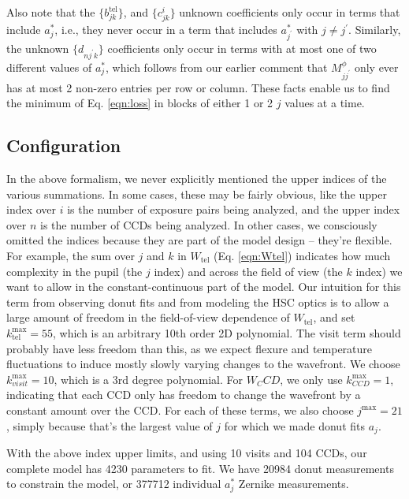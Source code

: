 \documentclass{article}
\begin{document}
Also note that the $\{b^\mathrm{tel}_{jk}\}$, and $\{c^i_{jk}\}$ unknown
coefficients only occur in terms that include $a_j^\ast$, i.e., they never occur
in a term that includes $a_{j^\prime}^\ast$ with $j \ne j^\prime$.  Similarly,
the unknown $\{d_{n j^\prime k}\}$ coefficients only occur in terms with at most
one of two different values of $a_j^\ast$, which follows from our earlier
comment that $M^\phi_{j j^\prime}$ only ever has at most 2 non-zero entries per
row or column.  These facts enable us to find the minimum of Eq. \ref{eqn:loss}
in blocks of either 1 or 2 $j$ values at a time.

\subsection{Configuration}

In the above formalism, we never explicitly mentioned the upper indices of the
various summations.  In some cases, these may be fairly obvious, like the upper
index over $i$ is the number of exposure pairs being analyzed, and the upper
index over $n$ is the number of CCDs being analyzed.  In other cases, we
consciously omitted the indices because they are part of the model design --
they're flexible.  For example, the sum over $j$ and $k$ in $W_\mathrm{tel}$
(Eq. \ref{eqn:Wtel}) indicates how much complexity in the pupil (the $j$ index)
and across the field of view (the $k$ index) we want to allow in the
constant-continuous part of the model.  Our intuition for this term from
observing donut fits and from modeling the HSC optics is to allow a large amount
of freedom in the field-of-view dependence of $W_\mathrm{tel}$, and set
$k^\mathrm{max}_\mathrm{tel} = 55$, which is an arbitrary 10th order 2D
polynomial.  The visit term should probably have less freedom than this, as we
expect flexure and temperature fluctuations to induce mostly slowly varying
changes to the wavefront.  We choose $k^\mathrm{max}_{visit} = 10$, which is a
3rd degree polynomial.  For $W_CCD$, we only use $k^\mathrm{max}_{CCD} = 1$,
indicating that each CCD only has freedom to change the wavefront by a constant
amount over the CCD.  For each of these terms, we also choose $j^\mathrm{max} =
21$, simply because that's the largest value of $j$ for which we made donut fits
$a_j$.

With the above index upper limits, and using 10 visits and 104 CCDs, our
complete model has 4230 parameters to fit.  We have 20984 donut measurements to
constrain the model, or 377712 individual $a_j^\ast$ Zernike measurements.
\end{document}
